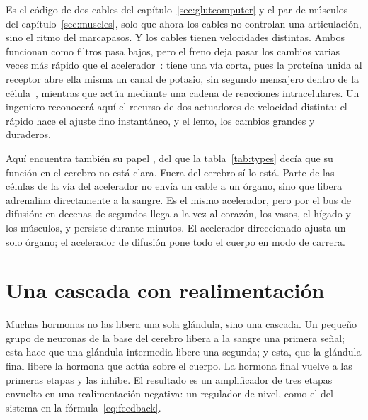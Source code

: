 Es el código de dos cables del capítulo~\ref{sec:glutcomputer} y el par de músculos del capítulo~\ref{sec:muscles}, solo que ahora los cables no controlan una articulación, sino el ritmo del marcapasos. Y los cables tienen velocidades distintas. Ambos funcionan como filtros pasa bajos, pero el freno deja pasar los cambios varias veces más rápido que el acelerador~\cite{Berger1989}:  tiene una vía corta, pues la proteína unida al receptor abre ella misma un canal de potasio, sin segundo mensajero dentro de la célula~\cite{Logothetis1987gbg}, mientras que  actúa mediante una cadena de reacciones intracelulares. Un ingeniero reconocerá aquí el recurso de dos actuadores de velocidad distinta: el rápido hace el ajuste fino instantáneo, y el lento, los cambios grandes y duraderos.

Aquí encuentra también su papel , del que la tabla~\ref{tab:types} decía que su función en el cerebro no está clara. Fuera del cerebro sí lo está. Parte de las células de la vía del acelerador no envía un cable a un órgano, sino que libera adrenalina directamente a la sangre. Es el mismo acelerador, pero por el bus de difusión: en decenas de segundos llega a la vez al corazón, los vasos, el hígado y los músculos, y persiste durante minutos. El acelerador direccionado  ajusta un solo órgano; el acelerador de difusión  pone todo el cuerpo en modo de carrera.

\section{Una cascada con realimentación}

Muchas hormonas no las libera una sola glándula, sino una cascada. Un pequeño grupo de neuronas de la base del cerebro libera a la sangre una primera señal; esta hace que una glándula intermedia libere una segunda; y esta, que la glándula final libere la hormona que actúa sobre el cuerpo. La hormona final vuelve a las primeras etapas y las inhibe. El resultado es un amplificador de tres etapas envuelto en una realimentación negativa: un regulador de nivel, como el del sistema  en la fórmula~\eqref{eq:feedback}.


